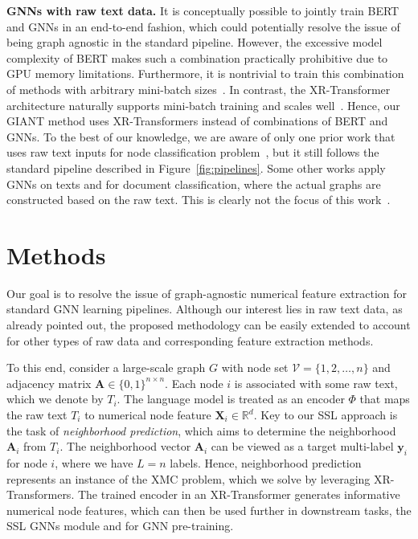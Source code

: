 \documentclass{article} \usepackage{iclr2022_conference,times}
\begin{document}
\textbf{GNNs with raw text data. }
It is conceptually possible to jointly train BERT and GNNs in an end-to-end fashion, which could potentially resolve the issue of being graph agnostic in the standard pipeline. However, the excessive model complexity of BERT makes such a combination practically prohibitive due to GPU memory limitations. Furthermore, it is nontrivial to train this combination of methods with arbitrary mini-batch sizes~\citep{chiang2019cluster,graphsaint-iclr20}. In contrast, the XR-Transformer architecture naturally supports mini-batch training and scales well~\citep{jiang2021lightxml}. Hence, our GIANT method uses XR-Transformers instead of combinations of BERT and GNNs. To the best of our knowledge, we are aware of only one prior work that uses raw text inputs for node classification problem~\citep{zhang2020graph}, but it still follows the standard pipeline described in Figure~\ref{fig:pipelines}. Some other works apply GNNs on texts and for document classification, where the actual graphs are constructed based on the raw text. This is clearly not the focus of this work~\citep{yao2019graph,huang2019text,zhang2020text,liu2020tensor}.

\vspace{-0.3cm}
\section{Methods}\label{sec:method}
Our goal is to resolve the issue of graph-agnostic numerical feature extraction for standard GNN learning pipelines. Although our interest lies in raw text data, as already pointed out, the proposed methodology can be easily extended to account for other types of raw data and corresponding feature extraction methods. 


To this end, consider a large-scale graph $G$ with node set $\mathcal{V}=\{1,2,\ldots,n\}$ and adjacency matrix $\mathbf{A}\in \{0,1\}^{n\times n}$. Each node $i$ is associated with some raw text, which we denote by $T_i$. The language model is treated as an encoder $\Phi$ that maps the raw text $T_i$ to numerical node feature $\mathbf{X}_i\in \mathbb{R}^d$. Key to our SSL approach is the task of \emph{neighborhood prediction}, which aims to determine the neighborhood $\mathbf{A}_i$ from $T_i$. The neighborhood vector $\mathbf{A}_i$ can be viewed as a target multi-label $\mathbf{y}_i$ for node $i$, where we have $L=n$ labels. Hence, neighborhood prediction represents an instance of the XMC problem, which we solve by leveraging XR-Transformers. The trained encoder in an XR-Transformer generates informative numerical node features, which can then be used further in downstream tasks, the SSL GNNs module and for GNN pre-training. 
\end{document}
